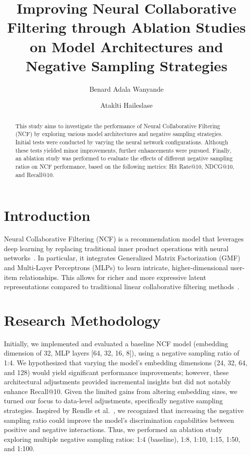 \documentclass[runningheads]{llncs}
\begin{document}
\title{Improving Neural Collaborative Filtering through Ablation Studies on Model Architectures and Negative Sampling Strategies}


\author{Benard Adala Wanyande \and Ataklti Haileslase}



\maketitle

\begin{abstract}
This study aims to investigate the performance of Neural Collaborative Filtering (NCF) by exploring various model architectures and negative sampling strategies. Initial tests were conducted by varying the neural network configurations. Although these tests yielded minor improvements, further enhancements were pursued. Finally, an ablation study was performed to evaluate the effects of different negative sampling ratios on NCF performance, based on the following metrics: Hit Rate@10, NDCG@10, and Recall@10.
\end{abstract}

\section{Introduction}
Neural Collaborative Filtering (NCF) is a recommendation model that leverages deep learning by replacing traditional inner product operations with neural networks~\cite{he2017neural}. In particular, it integrates Generalized Matrix Factorization (GMF)\cite{he2017neural} and Multi-Layer Perceptrons (MLPs)\cite{he2017neural} to learn intricate, higher-dimensional user-item relationships. This allows for richer and more expressive latent representations compared to traditional linear collaborative filtering methods~\cite{koren2009matrix}.

\section{Research Methodology}
Initially, we implemented and evaluated a baseline NCF model (embedding dimension of 32, MLP layers [64, 32, 16, 8]), using a negative sampling ratio of 1:4. We hypothesized that varying the model's embedding dimensions (24, 32, 64, and 128) would yield significant performance improvements; however, these architectural adjustments provided incremental insights but did not notably enhance Recall@10. Given the limited gains from altering embedding sizes, we turned our focus to data-level adjustments, specifically negative sampling strategies. Inspired by Rendle et al.~\cite{rendle2012bpr}, we recognized that increasing the negative sampling ratio could improve the model's discrimination capabilities between positive and negative interactions. Thus, we performed an ablation study exploring multiple negative sampling ratios: 1:4 (baseline), 1:8, 1:10, 1:15, 1:50, and 1:100.
\end{document}
